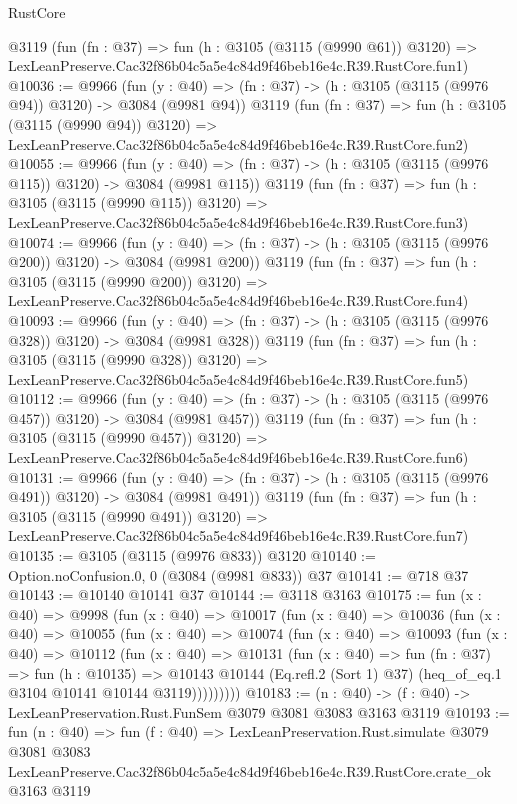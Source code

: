 \begin{lexlean}{RustCore}
\begin{coremodule}
    @3119
    (fun (fn : @37) =>
    fun (h : @3105 (@3115 (@9990 @61)) @3120) =>
    LexLeanPreserve.Cac32f86b04c5a5e4c84d9f46beb16e4c.R39.RustCore.fun1)
@10036 := @9966
    (fun (y : @40) => (fn : @37) -> (h : @3105 (@3115 (@9976 @94)) @3120) -> @3084 (@9981 @94))
    @3119
    (fun (fn : @37) =>
    fun (h : @3105 (@3115 (@9990 @94)) @3120) =>
    LexLeanPreserve.Cac32f86b04c5a5e4c84d9f46beb16e4c.R39.RustCore.fun2)
@10055 := @9966
    (fun (y : @40) => (fn : @37) -> (h : @3105 (@3115 (@9976 @115)) @3120) -> @3084 (@9981 @115))
    @3119
    (fun (fn : @37) =>
    fun (h : @3105 (@3115 (@9990 @115)) @3120) =>
    LexLeanPreserve.Cac32f86b04c5a5e4c84d9f46beb16e4c.R39.RustCore.fun3)
@10074 := @9966
    (fun (y : @40) => (fn : @37) -> (h : @3105 (@3115 (@9976 @200)) @3120) -> @3084 (@9981 @200))
    @3119
    (fun (fn : @37) =>
    fun (h : @3105 (@3115 (@9990 @200)) @3120) =>
    LexLeanPreserve.Cac32f86b04c5a5e4c84d9f46beb16e4c.R39.RustCore.fun4)
@10093 := @9966
    (fun (y : @40) => (fn : @37) -> (h : @3105 (@3115 (@9976 @328)) @3120) -> @3084 (@9981 @328))
    @3119
    (fun (fn : @37) =>
    fun (h : @3105 (@3115 (@9990 @328)) @3120) =>
    LexLeanPreserve.Cac32f86b04c5a5e4c84d9f46beb16e4c.R39.RustCore.fun5)
@10112 := @9966
    (fun (y : @40) => (fn : @37) -> (h : @3105 (@3115 (@9976 @457)) @3120) -> @3084 (@9981 @457))
    @3119
    (fun (fn : @37) =>
    fun (h : @3105 (@3115 (@9990 @457)) @3120) =>
    LexLeanPreserve.Cac32f86b04c5a5e4c84d9f46beb16e4c.R39.RustCore.fun6)
@10131 := @9966
    (fun (y : @40) => (fn : @37) -> (h : @3105 (@3115 (@9976 @491)) @3120) -> @3084 (@9981 @491))
    @3119
    (fun (fn : @37) =>
    fun (h : @3105 (@3115 (@9990 @491)) @3120) =>
    LexLeanPreserve.Cac32f86b04c5a5e4c84d9f46beb16e4c.R39.RustCore.fun7)
@10135 := @3105 (@3115 (@9976 @833)) @3120
@10140 := Option.noConfusion.{0, 0} (@3084 (@9981 @833)) @37
@10141 := @718 @37
@10143 := @10140 @10141 @37
@10144 := @3118 @3163
@10175 := fun (x : @40) =>
  @9998
    (fun (x : @40) =>
    @10017
      (fun (x : @40) =>
      @10036
        (fun (x : @40) =>
        @10055
          (fun (x : @40) =>
          @10074
            (fun (x : @40) =>
            @10093
              (fun (x : @40) =>
              @10112
                (fun (x : @40) =>
                @10131
                  (fun (x : @40) =>
                  fun (fn : @37) =>
                  fun (h : @10135) =>
                  @10143
                    @10144
                    (Eq.refl.{2} (Sort 1) @37)
                    (heq_of_eq.{1} @3104 @10141 @10144 @3119)))))))))
@10183 := (n : @40) -> (f : @40) -> LexLeanPreservation.Rust.FunSem @3079 @3081 @3083 @3163 @3119
@10193 := fun (n : @40) =>
  fun (f : @40) =>
  LexLeanPreservation.Rust.simulate
    @3079
    @3081
    @3083
    LexLeanPreserve.Cac32f86b04c5a5e4c84d9f46beb16e4c.R39.RustCore.crate_ok
    @3163
    @3119
\end{coremodule}
\end{lexlean}
